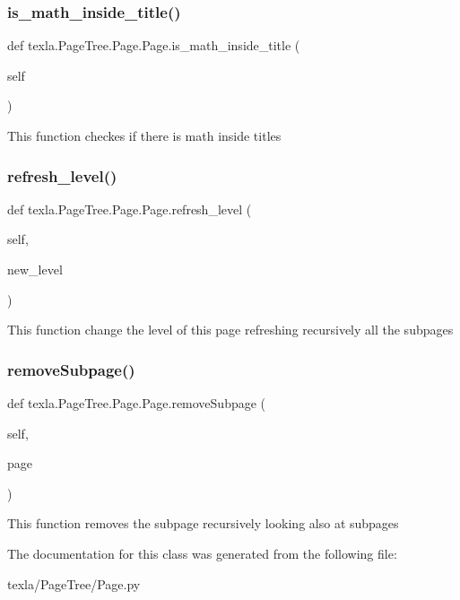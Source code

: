 \subsubsection{\texorpdfstring{is\+\_\+math\+\_\+inside\+\_\+title()}{is\_math\_inside\_title()}}
{\footnotesize\ttfamily def texla.\+Page\+Tree.\+Page.\+Page.\+is\+\_\+math\+\_\+inside\+\_\+title (\begin{DoxyParamCaption}\item[{}]{self }\end{DoxyParamCaption})}

\begin{DoxyVerb}This function checkes if there is math inside titles\end{DoxyVerb}
 \hypertarget{classtexla_1_1PageTree_1_1Page_1_1Page_aa16c3d6d8ec200fa8e4414d152e84577}{}\label{classtexla_1_1PageTree_1_1Page_1_1Page_aa16c3d6d8ec200fa8e4414d152e84577} 
\subsubsection{\texorpdfstring{refresh\+\_\+level()}{refresh\_level()}}
{\footnotesize\ttfamily def texla.\+Page\+Tree.\+Page.\+Page.\+refresh\+\_\+level (\begin{DoxyParamCaption}\item[{}]{self,  }\item[{}]{new\+\_\+level }\end{DoxyParamCaption})}

\begin{DoxyVerb}This function change the level of this page
refreshing recursively all the subpages\end{DoxyVerb}
 \hypertarget{classtexla_1_1PageTree_1_1Page_1_1Page_a6c977d8a5d051a28520de3f2bf5f17ee}{}\label{classtexla_1_1PageTree_1_1Page_1_1Page_a6c977d8a5d051a28520de3f2bf5f17ee} 
\subsubsection{\texorpdfstring{remove\+Subpage()}{removeSubpage()}}
{\footnotesize\ttfamily def texla.\+Page\+Tree.\+Page.\+Page.\+remove\+Subpage (\begin{DoxyParamCaption}\item[{}]{self,  }\item[{}]{page }\end{DoxyParamCaption})}

\begin{DoxyVerb}This function removes the subpage
recursively looking also at subpages\end{DoxyVerb}
 

The documentation for this class was generated from the following file\+:\begin{DoxyCompactItemize}
\item 
texla/\+Page\+Tree/Page.\+py\end{DoxyCompactItemize}
